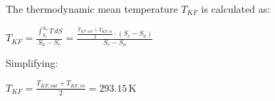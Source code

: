 The thermodynamic mean temperature \( T_{KF} \) is calculated as:  

\( T_{KF} = \frac{\int_{S_e}^{S_a} T \, dS}{S_a - S_e} = \frac{\frac{T_{KF,out} + T_{KF,in}}{2} \cdot (S_e - S_a)}{S_e - S_a} \)  

Simplifying:  

\( T_{KF} = \frac{T_{KF,out} + T_{KF,in}}{2} = 293.15 \, \text{K} \)